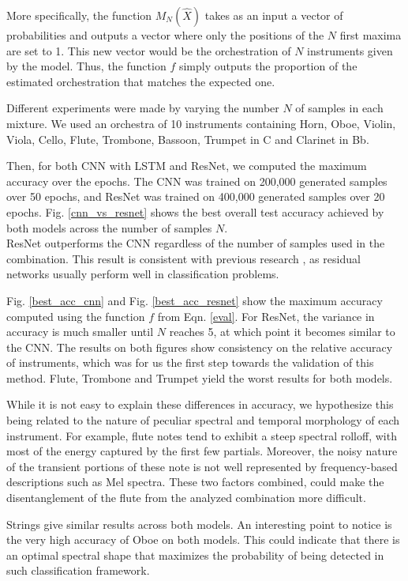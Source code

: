 \documentclass{article}
\begin{document}
More specifically, the function $M_N(\hat{X})$ takes as an input a vector of probabilities and outputs a vector where only the positions of the $N$ first maxima are set to 1. This new vector would be the orchestration of $N$ instruments given by the model. Thus, the function $f$ simply outputs the proportion of the estimated orchestration that matches the expected one.

Different experiments were made by varying the number $N$ of samples in each mixture. We used an orchestra of 10 instruments containing Horn, Oboe, Violin, Viola, Cello, Flute, Trombone, Bassoon, Trumpet in C and Clarinet in Bb.

Then, for both CNN with LSTM and ResNet, we computed the maximum accuracy over the epochs. 
The CNN was trained on 200,000 generated samples over 50 epochs, and ResNet was trained on 400,000 generated samples over 20 epochs. Fig. \ref{cnn_vs_resnet} shows the best overall test accuracy achieved by both models across the number of samples $N$.\\

ResNet outperforms the CNN regardless of the number of samples used in the combination. This result is consistent with previous research \cite{He15}, as residual networks usually perform well in classification problems.

Fig. \ref{best_acc_cnn} and Fig. \ref{best_acc_resnet} show the maximum accuracy computed using the function $f$ from Eqn. \eqref{eval}. For ResNet, the variance in accuracy is much smaller until $N$ reaches 5, at which point it becomes similar to the CNN. The results on both figures show consistency on the relative accuracy of instruments, which was for us the first step towards the validation of this method. Flute, Trombone and Trumpet yield the worst results for both models. 

While it is not easy to explain these differences in accuracy, we hypothesize this being related to the nature of peculiar spectral and temporal morphology of each instrument. For example, flute notes tend to exhibit a steep spectral rolloff, with most of the energy captured by the first few partials. Moreover, the noisy nature of the transient portions of these note is not well represented by frequency-based descriptions such as Mel spectra. These two factors combined, could make the disentanglement of the flute from the analyzed combination more difficult.

Strings give similar results across both models. An interesting point to notice is the very high accuracy of Oboe on both models. This could indicate that there is an optimal spectral shape that maximizes the probability of being detected in such classification framework.
\end{document}
